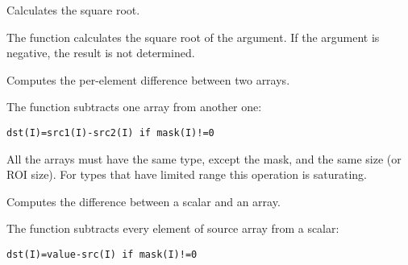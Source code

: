 Calculates the square root.


\begin{description}
\end{description}


The function calculates the square root of the argument. If the argument is negative, the result is not determined.

Computes the per-element difference between two arrays.


\begin{description}
\end{description}


The function subtracts one array from another one:

\begin{lstlisting}
dst(I)=src1(I)-src2(I) if mask(I)!=0
\end{lstlisting}

All the arrays must have the same type, except the mask, and the same size (or ROI size).
For types that have limited range this operation is saturating.

Computes the difference between a scalar and an array.


\begin{description}
\end{description}

The function subtracts every element of source array from a scalar:

\begin{lstlisting}
dst(I)=value-src(I) if mask(I)!=0
\end{lstlisting}

